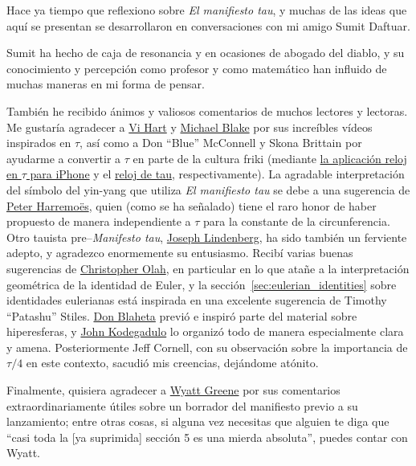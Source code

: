 Hace ya tiempo que reflexiono sobre \emph{El manifiesto tau}, y muchas de las ideas que aquí se presentan se desarrollaron en conversaciones con mi amigo Sumit Daftuar.

Sumit ha hecho de caja de resonancia y en ocasiones de abogado del diablo, y su conocimiento y percepción como profesor y como matemático han influido de muchas maneras en mi forma de pensar.

También he recibido ánimos y valiosos comentarios de muchos lectores y lectoras. Me gustaría agradecer a \href{http://www.youtube.com/watch?v=jG7vhMMXagQ}{Vi Hart} y \href{http://www.youtube.com/watch?v=3174T-3-59Q}{Michael Blake} por sus increíbles vídeos inspirados en $\tau$, así como a Don ``Blue'' McConnell y Skona Brittain por ayudarme a convertir a $\tau$ en parte de la cultura friki (mediante \href{http://tauclock.com/}{la aplicación reloj en $\tau$ para iPhone} y el \href{http://www.sbcrafts.net/clocks/}{reloj de tau}, respectivamente). La agradable interpretación del símbolo del yin-yang que utiliza \emph{El manifiesto tau} se debe a una sugerencia de \href{http://www.harremoes.dk/Peter/}{Peter Harremo\"{e}s}, quien (como se ha señalado) tiene el raro honor de haber propuesto de manera independiente a $\tau$ para la constante de la circunferencia. Otro tauista pre--\emph{Manifesto tau}, \href{https://sites.google.com/site/taubeforeitwascool/}{Joseph Lindenberg}, ha sido también un ferviente adepto, y agradezco enormemente su entusiasmo. Recibí varias buenas sugerencias de \href{http://christopherolah.wordpress.com/about-me}{Christopher Olah}, en particular en lo que atañe a la interpretación geométrica de la identidad de Euler, y la sección~\ref{sec:eulerian_identities} sobre identidades eulerianas está inspirada en una excelente sugerencia de Timothy ``Patashu'' Stiles. \href{http://www.blahedo.org/blog/archives/001083.html}{Don Blaheta} previó e inspiró parte del material sobre hiperesferas, y \href{http://spikedmath.com/forum/viewtopic.php?f=30&t=147\#p1577}{John Kodegadulo} lo organizó todo de manera especialmente clara y amena. Posteriormente Jeff Cornell, con su observación sobre la importancia de $\tau/4$ en este contexto, sacudió mis creencias, dejándome atónito.

Finalmente, quisiera agradecer a \href{http://techiferous.com/about}{Wyatt Greene} por sus comentarios extraordinariamente útiles sobre un borrador del manifiesto previo a su lanzamiento; entre otras cosas, si alguna vez necesitas que alguien te diga que ``casi toda la [ya suprimida] sección 5 es una mierda absoluta'', puedes contar con Wyatt.


